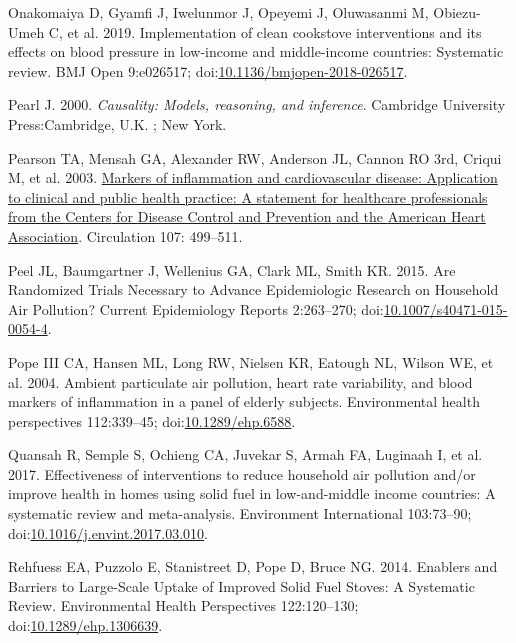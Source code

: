 \documentclass[
  letterpaper,
  DIV=11,
  numbers=noendperiod]{scrartcl}
\newlength{\cslhangindent}
\newlength{\cslentryspacingunit} %
\newenvironment{CSLReferences}[2] %
 {%
  \setlength{\parindent}{0pt}
  \ifodd #1
  \let\oldpar\par
  \def\par{\hangindent=\cslhangindent\oldpar}
  \fi
  \setlength{\parskip}{#2\cslentryspacingunit}
 }%
 {}
\begin{document}
\begin{CSLReferences}{1}{0}
\leavevmode{}%
Onakomaiya D, Gyamfi J, Iwelunmor J, Opeyemi J, Oluwasanmi M,
Obiezu-Umeh C, et al. 2019. Implementation of clean cookstove
interventions and its effects on blood pressure in low-income and
middle-income countries: Systematic review. BMJ Open 9:e026517;
doi:\href{https://doi.org/10.1136/bmjopen-2018-026517}{10.1136/bmjopen-2018-026517}.

\leavevmode{}%
Pearl J. 2000. \emph{Causality: Models, reasoning, and inference}.
Cambridge University Press:Cambridge, U.K. ; New York.

\leavevmode{}%
Pearson TA, Mensah GA, Alexander RW, Anderson JL, Cannon RO 3rd, Criqui
M, et al. 2003.
\href{https://www.ncbi.nlm.nih.gov/pubmed/12551878}{Markers of
inflammation and cardiovascular disease: Application to clinical and
public health practice: {A} statement for healthcare professionals from
the {Centers} for {Disease Control} and {Prevention} and the {American
Heart Association}}. Circulation 107: 499--511.

\leavevmode{}%
Peel JL, Baumgartner J, Wellenius GA, Clark ML, Smith KR. 2015. Are
{Randomized Trials Necessary} to {Advance Epidemiologic Research} on
{Household Air Pollution}? Current Epidemiology Reports 2:263--270;
doi:\href{https://doi.org/10.1007/s40471-015-0054-4}{10.1007/s40471-015-0054-4}.

\leavevmode{}%
Pope III CA, Hansen ML, Long RW, Nielsen KR, Eatough NL, Wilson WE, et
al. 2004. Ambient particulate air pollution, heart rate variability, and
blood markers of inflammation in a panel of elderly subjects.
Environmental health perspectives 112:339--45;
doi:\href{https://doi.org/10.1289/ehp.6588}{10.1289/ehp.6588}.

\leavevmode{}%
Quansah R, Semple S, Ochieng CA, Juvekar S, Armah FA, Luginaah I, et al.
2017. Effectiveness of interventions to reduce household air pollution
and/or improve health in homes using solid fuel in low-and-middle income
countries: {A} systematic review and meta-analysis. Environment
International 103:73--90;
doi:\href{https://doi.org/10.1016/j.envint.2017.03.010}{10.1016/j.envint.2017.03.010}.

\leavevmode{}%
Rehfuess EA, Puzzolo E, Stanistreet D, Pope D, Bruce NG. 2014. Enablers
and {Barriers} to {Large-Scale Uptake} of {Improved Solid Fuel Stoves}:
{A Systematic Review}. Environmental Health Perspectives 122:120--130;
doi:\href{https://doi.org/10.1289/ehp.1306639}{10.1289/ehp.1306639}.


\end{CSLReferences}
\end{document}

